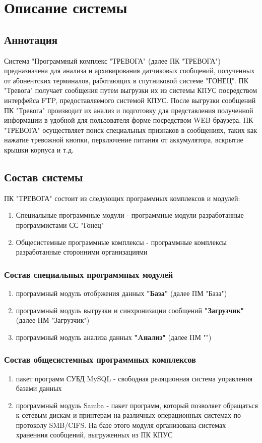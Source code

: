 \documentclass[12pt]{article}[a4paper,14pt,russian]
\begin{document}
	\section{Описание системы}
	\subsection{Аннотация}

	Система "Программный комплекс "ТРЕВОГА" (далее ПК "ТРЕВОГА") предназначена для анализа и архивирования датчиковых сообщений, полученных от абонентских терминалов, работающих в спутниковой системе "ГОНЕЦ". ПК "Тревога" получает сообщения путем выгрузки их из системы КПУС посредством интерфейса FTP, предоставляемого системой КПУС. После выгрузки сообщений ПК "Тревога" производит их анализ и подготовку для представления полученной информации в удобной для пользователя форме посредством WEB браузера. ПК "ТРЕВОГА" осуществляет поиск специальных признаков в сообщениях, таких как нажатие тревожной кнопки, перключение питания от аккумулятора, вскрытие крышки корпуса и т.д.
	
	\subsection{Состав системы}
    ПК "ТРЕВОГА" состоит из следующих программных комплексов и модулей:
	\begin{enumerate}
	\item  Специальные программные модули - программные модули разработанные программистами  СС "Гонец"
	\item  Общесистемные программные комплексы  - программные комплексы разработанные сторонними организациями
	\end{enumerate}
    \subsubsection {Состав специальных программных модулей}
	\begin{enumerate}
	\item программный модуль отобржения данных \textbf{"База"} (далее ПМ "База")
	\item программный модуль выгрузки и синхронизации сообщений \textbf{"Загрузчик"} (далее ПМ "Загрузчик")
	\item программный модуль анализа данных \textbf{"Aнализ"} (далее ПМ "")
	\end{enumerate}
    \subsubsection {Состав общесистемных программных комплексов}
    \begin{enumerate}
    \item пакет программ СУБД MySQL - свободная реляционная система управления базами данных
    \item программный модуль Samba - пакет программ, который позволяет обращаться к сетевым дискам и принтерам на различных операционных системах по протоколу SMB/CIFS. На базе этого модуля организована системах храненния сообщений, выгруженных из ПК КПУС
    \end{enumerate}
\end{document}
